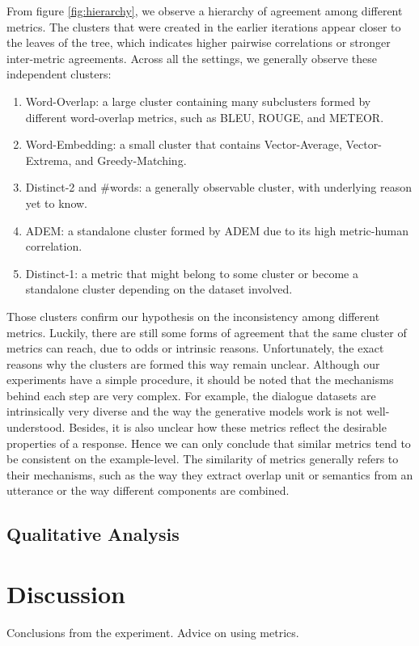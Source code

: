 \documentclass[runningheads]{llncs}
\begin{document}
    From figure \ref{fig:hierarchy}, we observe a hierarchy of agreement among different metrics. The clusters that were created in the earlier iterations appear closer to the leaves of the tree, which indicates higher pairwise correlations or stronger inter-metric agreements. Across all the settings, we generally observe these independent clusters:
    \begin{enumerate}
        \item Word-Overlap: a large cluster containing many subclusters formed by different word-overlap metrics, such as BLEU, ROUGE, and METEOR.
        \item Word-Embedding: a small cluster that contains Vector-Average, Vector-Extrema, and Greedy-Matching.
        \item Distinct-2 and \#words: a generally observable cluster, with underlying reason yet to know.
        \item ADEM: a standalone cluster formed by ADEM due to its high metric-human correlation.
        \item Distinct-1: a metric that might belong to some cluster or become a standalone cluster depending on the dataset involved.
    \end{enumerate}
    

    Those clusters confirm our hypothesis on the inconsistency among different metrics. Luckily, there are still some forms of agreement that the same cluster of metrics can reach, due to odds or intrinsic reasons. Unfortunately, the exact reasons why the clusters are formed this way remain unclear. Although our experiments have a simple procedure, it should be noted that the mechanisms behind each step are very complex. For example, the dialogue datasets are intrinsically very diverse and the way the generative models work is not well-understood. Besides, it is also unclear how these metrics reflect the desirable properties of a response. Hence we can only conclude that similar metrics tend to be consistent on the example-level. The similarity of metrics generally refers to their mechanisms, such as the way they extract overlap unit or semantics from an utterance or the way different components are combined.

    \subsection{Qualitative Analysis}


    \section{Discussion}
    Conclusions from the experiment.
    Advice on using metrics.
\end{document}
